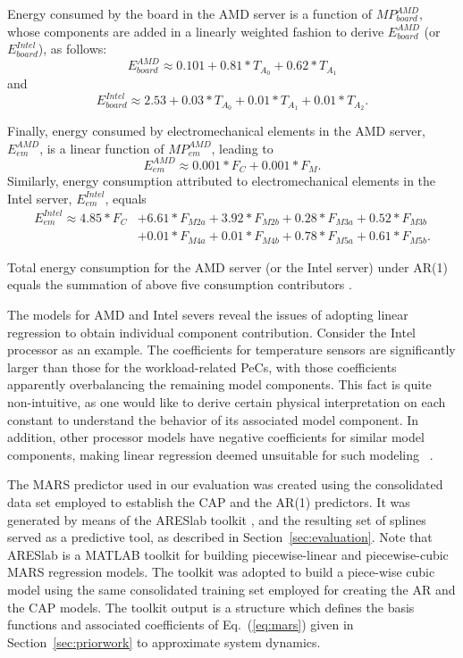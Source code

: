 \documentclass[prodmode,acmtaco,pdftex]{acmsmall}
\newcommand{\equationname}{Eq.}
\begin{document}
Energy consumed by the board in the AMD server is a function of $MP_{board}^{AMD}$,
whose components are added in a linearly weighted fashion to derive
$E_{board}^{AMD}$ (or $E_{board}^{Intel}$), as follows:
\begin{equation*}
E_{board}^{AMD} \approx 0.101+0.81*T_{A_{0}}+0.62*T_{A_{1}}
\end{equation*}
and
\begin{equation*}
E_{board}^{Intel} \approx 2.53+0.03*T_{A_{0}}+0.01*T_{A_{1}}+0.01*T_{A_{2}}.
\end{equation*}

Finally, energy consumed by electromechanical elements in the AMD server, $E_{em}^{AMD}$,
is a linear function of $MP_{em}^{AMD}$, leading to
\begin{equation*}
E_{em}^{AMD} \approx 0.001*F_{C}+0.001*F_{M}.
\end{equation*}
Similarly, energy consumption attributed to electromechanical elements in the Intel server, $E_{em}^{Intel}$, equals
\begin{align*}
E_{em}^{Intel}\approx4.85*F_{C}&+6.61*F_{M2a}+3.92*F_{M2b}+0.28*F_{M3a}+0.52*F_{M3b}\\
            &+0.01*F_{M4a}+0.01*F_{M4b}+0.78*F_{M5a}+0.61*F_{M5b}.
\end{align*}

Total energy consumption for the AMD server (or the Intel server)
under AR(1) equals the summation of above five consumption contributors
\cite{Lewis2008}.

The models for AMD and Intel severs reveal the issues of adopting linear
regression to obtain individual component contribution.  Consider the
Intel processor as an example.  The coefficients for temperature sensors
are significantly larger than those for the workload-related PeCs, with
those coefficients apparently overbalancing the remaining model
components.  This fact is quite non-intuitive, as one would like to
derive certain physical interpretation on each constant to understand
the behavior of its associated model component.  In addition, other
processor models have negative coefficients for similar model
components, making linear regression deemed unsuitable for such modeling
~\cite{Bertran2010,McCullough2011}.

The MARS predictor used in our evaluation was created using the
consolidated data set employed to establish the CAP and the AR(1)
predictors.  It was generated by means of the ARESlab toolkit
\cite{Jekabsons2010}, and the resulting set of splines served as a
predictive tool, as described in Section~\ref{sec:evaluation}.  Note
that ARESlab is a MATLAB toolkit for building piecewise-linear and
piecewise-cubic MARS regression models.  The toolkit was adopted to
build a piece-wise cubic model using the same consolidated training set
employed for creating the AR and the CAP models.  The toolkit output is
a structure which defines the basis functions and associated
coefficients of \equationname~(\ref{eq:mars}) given in
Section~\ref{sec:priorwork} to approximate system dynamics.
\end{document}
